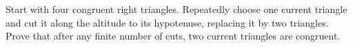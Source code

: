 Start with four congruent right triangles. Repeatedly choose one current triangle and cut it along the altitude to its hypotenuse, replacing it by two triangles. Prove that after any finite number of cuts, two current triangles are congruent.

